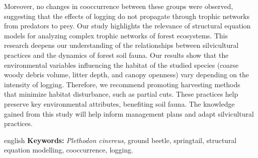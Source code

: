 Moreover, no changes in cooccurrence between these groups were observed, suggesting that the effects of logging do not propagate through trophic networks from predators to prey. 
Our study highlights the relevance of structural equation models for analyzing complex trophic networks of forest ecosystems. 
This research deepens our understanding of the relationships between silvicultural practices and the dynamics of forest soil fauna. 
Our results show that the environmental variables influencing the habitat of the studied species (coarse woody debris volume, litter depth, and canopy openness) vary depending on the intensity of logging. 
Therefore, we recommend promoting harvesting methods that minimize habitat disturbance, such as partial cuts. 
These practices help preserve key environmental attributes, benefiting soil fauna. 
The knowledge gained from this study will help inform management plans and adapt silvicultural practices.

\begin{otherlanguage*}{english}
  \textbf{Keywords:} \textit{Plethodon cinereus}, ground beetle, springtail, structural equation modelling, cooccurrence, logging.
  
\end{otherlanguage*}
